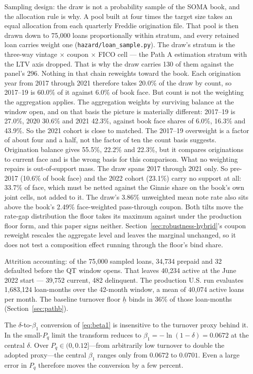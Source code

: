 \documentclass[12pt]{article}
\begin{document}
Sampling design: the draw is not a probability sample of the SOMA book, and the allocation rule is why. A pool built at four times the target size takes an equal allocation from each quarterly Freddie origination file. That pool is then drawn down to 75,000 loans proportionally within stratum, and every retained loan carries weight one (\texttt{hazard/loan\_sample.py}). The draw's stratum is the three-way vintage $\times$ coupon $\times$ FICO cell --- the Path A estimation stratum with the LTV axis dropped. That is why the draw carries 130 of them against the panel's 296. Nothing in that chain reweights toward the book. Each origination year from 2017 through 2021 therefore takes 20.0\% of the draw by count, so 2017--19 is 60.0\% of it against 6.0\% of book face. But count is not the weighting the aggregation applies. The aggregation weights by surviving balance at the window open, and on that basis the picture is materially different: 2017--19 is 27.0\%, 2020 30.6\% and 2021 42.3\%, against book face shares of 6.0\%, 16.3\% and 43.9\%. So the 2021 cohort is close to matched. The 2017--19 overweight is a factor of about four and a half, not the factor of ten the count basis suggests. Origination balance gives 55.5\%, 22.2\% and 22.3\%, but it compares originations to current face and is the wrong basis for this comparison. What no weighting repairs is out-of-support mass. The draw spans 2017 through 2021 only. So pre-2017 (10.6\% of book face) and the 2022 cohort (23.1\%) carry no support at all: 33.7\% of face, which must be netted against the Ginnie share on the book's own joint cells, not added to it. The draw's 3.86\% unweighted mean note rate also sits above the book's 2.49\% face-weighted pass-through coupon. Both tilts move the rate-gap distribution the floor takes its maximum against under the production floor form, and this paper signs neither. Section~\ref{sec:robustness-hybrid}'s coupon reweight rescales the aggregate level and leaves the marginal unchanged, so it does not test a composition effect running through the floor's bind share.

Attrition accounting: of the 75,000 sampled loans, 34,734 prepaid and 32 defaulted before the QT window opens. That leaves 40,234 active at the June 2022 start --- 39,752 current, 482 delinquent. The production U.S. run evaluates 1,683,124 loan-months over the 42-month window, a mean of 40,074 active loans per month. The baseline turnover floor $\underline{h}$ binds in 36\% of those loan-months (Section~\ref{sec:pathb}).

The $\delta$-to-$\beta_1$ conversion of \eqref{eq:beta1} is insensitive to the turnover proxy behind it. In the small-$P_q$ limit the transform reduces to $\beta_1 = -\ln(1-\delta) = 0.0672$ at the central $\delta$. Over $P_q \in (0, 0.12]$---from arbitrarily low turnover to double the adopted proxy---the central $\beta_1$ ranges only from $0.0672$ to $0.0701$. Even a large error in $P_q$ therefore moves the conversion by a few percent.
\end{document}
